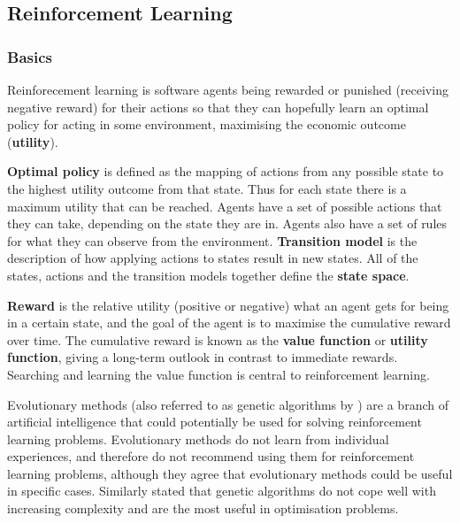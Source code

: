 \subsection{Reinforcement Learning}
\label{sec:literature:ai}


\subsubsection{Basics}
\label{sec:literature:ai:basics}

Reinforecement learning is software agents being rewarded or punished
(receiving negative reward) for their actions so that they can hopefully learn
an optimal policy for acting in some environment, maximising the economic
outcome (\textbf{utility}).

\textbf{Optimal policy} is defined as the mapping of actions from any possible
state to the highest utility outcome from that state. Thus for each state there
is a maximum utility that can be reached. Agents have a set of possible actions
that they can take, depending on the state they are in. Agents also have a set
of rules for what they can observe from the environment. \textbf{Transition
model} is the description of how applying actions to states result in new
states. All of the states, actions and the transition models together define
the \textbf{state space}. \parencite{Russell2010ai+modern,
Sutton1998ai+reinforcement}

\textbf{Reward} is the relative utility (positive or negative) what an agent
gets for being in a certain state, and the goal of the agent is to maximise the
cumulative reward over time. The cumulative reward is known as the
\textbf{value function} or \textbf{utility function}, giving a long-term
outlook in contrast to immediate rewards. Searching and learning the value
function is central to reinforcement learning. \parencite{Russell2010ai+modern,
Sutton1998ai+reinforcement}

Evolutionary methods \parencite{Sutton1998ai+reinforcement} (also referred to
as genetic algorithms by \textcite{Russell2010ai+modern}) are a branch of
artificial intelligence that could potentially be used for solving
reinforcement learning problems. Evolutionary methods do not learn from
individual experiences, and therefore \textcite{Sutton1998ai+reinforcement} do
not recommend using them for reinforcement learning problems, although they
agree that evolutionary methods could be useful in specific cases. Similarly
\textcite{Russell2010ai+modern} stated that genetic algorithms do not cope well
with increasing complexity and are the most useful in optimisation problems.



